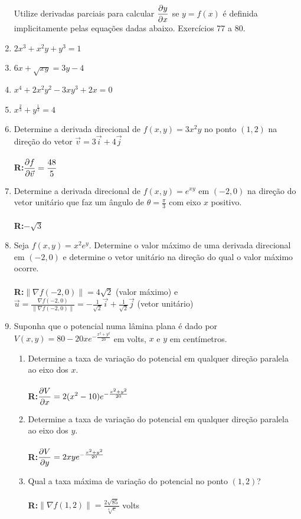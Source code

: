 \documentclass[oneside,a4paper,12pt]{article}
\newcommand{\R}{\\{\bf R:}}
\begin{document}
\begin{enumerate}
    Utilize derivadas parciais para calcular $\displaystyle \pdv{y}{x}$ se $y=f(x)$ é definida implicitamente pelas equações dadas abaixo. Exercícios 77 a 80.
            \item $2x^3 + x^2y+y^3=1$
            \item $6x+\sqrt{xy}=3y-4$
            \item $x^4+2x^2y^2-3xy^3+2x = 0$
            \item $x^{\frac{2}{3}}+y^{\frac{1}{3}}=4$
    \item Determine a derivada direcional de $f(x,y) = 3x^2y$ no ponto $(1,2)$ na direção do vetor $\vec{v} = 3\vec{i}+4\vec{j}$\\\R $\displaystyle \pdv{f}{\vec{v}}(1,2) = \frac{48}{5}$
    \item Determine a derivada direcional de $f(x,y) = e^{xy}$ em $(-2,0)$ na direção do vetor unitário que faz um ângulo de $\theta = \frac{\pi}{3}$ com  eixo $x$ positivo. \\\R $-\sqrt{3}$
    \item Seja $f(x,y) = x^2e^y$. Determine o valor máximo de uma derivada direcional em $(-2,0)$ e determine o vetor unitário na direção do qual o valor máximo ocorre. \\\R $\|\nabla f(-2,0)\| = 4 \sqrt{2}$ (valor máximo) e $\vec{u} = \displaystyle \frac{\nabla f(-2,0)}{\|\nabla f(-2,0)\|}= -\frac{1}{\sqrt{2}}\vec{i}+\frac{1}{\sqrt{2}}\vec{j}$ (vetor unitário)
    \item Suponha que o potencial numa lâmina plana é dado por $V(x,y) = 80-20xe^{- \displaystyle \frac{x^2+y^2}{20}}$ em volts, $x$ e $y$ em centímetros. 
        \begin{enumerate}
            \item Determine a taxa de variação do potencial em qualquer direção paralela ao eixo dos $x$. \\\R $\displaystyle \pdv{V}{x}(x,y) = 2(x^2-10)e^{-\frac{x^2+y^2}{20}}$
            \item Determine a taxa de variação do potencial em qualquer direção paralela ao eixo dos $y$. \\\R $\displaystyle \pdv{V}{y}(x,y)=2xye^{-\frac{x^2+y^2}{20}}$
            \item Qual a taxa máxima de variação do potencial no ponto $(1,2)$?\\\R $\|\nabla f(1,2)\| = \displaystyle \frac{2\sqrt{85}}{\sqrt[4]{e}}$ volts

\end{enumerate}
\end{enumerate}
\end{document}
